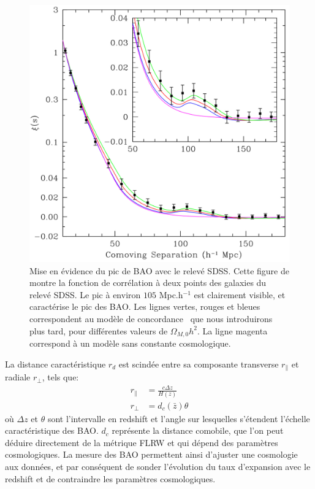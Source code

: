 \documentclass[../main/main.tex]{subfiles}
\begin{document}
\begin{figure}[ht]
  \begin{minipage}[c]{0.55\textwidth}
    \includegraphics[width=\textwidth]{../figures/01_cosmology/BAOpeak.pdf}
  \end{minipage}\hfill
  \begin{minipage}[c]{0.42\textwidth}
    \caption[Mise en évidence du pic de BAO avec le relevé SDSS.]{Mise en
    évidence du pic de BAO avec le relevé SDSS. Cette figure de
    \citet{Eisenstein} montre la fonction de corrélation à deux points
    des galaxies du relevé SDSS. Le pic à environ $105$ Mpc.h$^{-1}$ est
  clairement visible, et caractérise le pic des BAO. Les lignes vertes,
  rouges et bleues correspondent au modèle de concordance \lcdm\, que
  nous introduirons plus tard, pour différentes valeurs de
  $\Omega_{M,0}h^{2}$. La ligne magenta correspond à un modèle sans
  constante cosmologique.}\label{fig:baopeak}
  \end{minipage}
\end{figure}

La distance caractéristique $r_{d}$ est scindée
entre sa composante transverse $r_{\parallel}$ et radiale $r_{\perp}$,
tels que:
\begin{align}
  \label{eq:bao}
  r_{\parallel}&=\frac{c\Delta z}{H(z)}\\
  r_{\perp}&=d_{c}(\bar{z})\theta
\end{align}
où $\Delta z$ et $\theta$ sont l'intervalle en redshift et
l'angle sur lesquelles s'étendent l'échelle caractéristique des
BAO. $d_{c}$ représente la distance comobile, que l'on peut déduire
directement de la métrique FLRW et qui dépend des paramètres
cosmologiques. La mesure des BAO permettent ainsi d'ajuster une
cosmologie aux données, et par conséquent de sonder l'évolution du taux
d'expansion avec le redshift et de
contraindre les paramètres cosmologiques.
\end{document}
